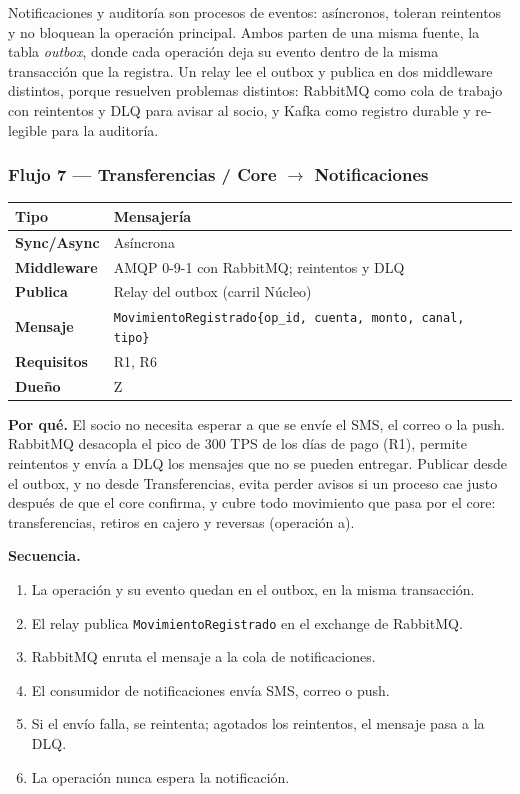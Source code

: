 \documentclass[11pt,a4paper]{article}
\begin{document}
Notificaciones y auditoría son procesos de eventos: asíncronos, toleran
reintentos y no bloquean la operación principal. Ambos parten de una misma
fuente, la tabla \emph{outbox}, donde cada operación deja su evento dentro de
la misma transacción que la registra. Un relay lee el outbox y publica en dos
middleware distintos, porque resuelven problemas distintos: RabbitMQ como cola
de trabajo con reintentos y DLQ para avisar al socio, y Kafka como registro
durable y re-legible para la auditoría.

\subsubsection*{Flujo 7 --- Transferencias / Core $\rightarrow$ Notificaciones}

\begin{tabular}{|l|p{9.5cm}|}
\hline
\textbf{Tipo} & Mensajería \\ \hline
\textbf{Sync/Async} & Asíncrona \\ \hline
\textbf{Middleware} & AMQP 0-9-1 con RabbitMQ; reintentos y DLQ \\ \hline
\textbf{Publica} & Relay del outbox (carril Núcleo) \\ \hline
\textbf{Mensaje} & \texttt{MovimientoRegistrado\{op\_id, cuenta, monto, canal, tipo\}} \\ \hline
\textbf{Requisitos} & R1, R6 \\ \hline
\textbf{Dueño} & Z \\ \hline
\end{tabular}

\medskip
\textbf{Por qué.} El socio no necesita esperar a que se envíe el SMS, el
correo o la push. RabbitMQ desacopla el pico de 300 TPS de los días de pago
(R1), permite reintentos y envía a DLQ los mensajes que no se pueden entregar.
Publicar desde el outbox, y no desde Transferencias, evita perder avisos si un
proceso cae justo después de que el core confirma, y cubre todo movimiento que
pasa por el core: transferencias, retiros en cajero y reversas (operación a).

\textbf{Secuencia.}
\begin{enumerate}
  \item La operación y su evento quedan en el outbox, en la misma transacción.
  \item El relay publica \texttt{MovimientoRegistrado} en el exchange de RabbitMQ.
  \item RabbitMQ enruta el mensaje a la cola de notificaciones.
  \item El consumidor de notificaciones envía SMS, correo o push.
  \item Si el envío falla, se reintenta; agotados los reintentos, el mensaje
        pasa a la DLQ.
  \item La operación nunca espera la notificación.
\end{enumerate}
\end{document}
